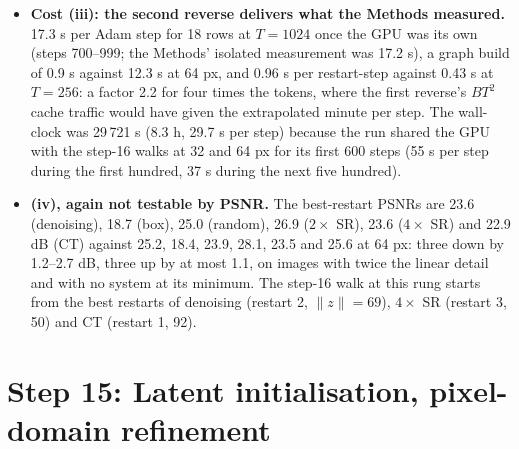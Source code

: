 \documentclass[11pt]{article}
\begin{document}
\begin{itemize}
        whose typical draws have norm 128 produces: the MAP of the 128-px
        posterior is a low-detail point of the prior, and the posterior mean
        the step-16 walk estimates from this start is the fairer object to
        compare across rungs.
  \item \textbf{Cost (iii): the second reverse delivers what the Methods
        measured.} 17.3 s per Adam step for 18 rows at $T = 1024$ once the
        GPU was its own (steps 700--999; the Methods' isolated measurement
        was 17.2 s), a graph build of 0.9 s against 12.3 s at 64 px, and
        0.96 s per restart-step against 0.43 s at $T = 256$: a factor 2.2
        for four times the tokens, where the first reverse's $BT^{2}$ cache
        traffic would have given the extrapolated minute per step. The
        wall-clock was 29\,721 s (8.3 h, 29.7 s per step) because the run
        shared the GPU with the step-16 walks at 32 and 64 px for its first
        600 steps (55 s per step during the first hundred, 37 s during the
        next five hundred).
  \item \textbf{(iv), again not testable by PSNR.} The best-restart PSNRs
        are 23.6 (denoising), 18.7 (box), 25.0 (random), 26.9 ($2\times$
        SR), 23.6 ($4\times$ SR) and 22.9 dB (CT) against 25.2, 18.4, 23.9,
        28.1, 23.5 and 25.6 at 64 px: three down by 1.2--2.7 dB, three up by
        at most 1.1, on images with twice the linear detail and with no
        system at its minimum. The step-16 walk at this rung starts from
        the best restarts of denoising (restart 2, $\|z\| = 69$), $4\times$
        SR (restart 3, 50) and CT (restart 1, 92).
\end{itemize}

\section{Step 15: Latent initialisation, pixel-domain refinement}
\label{sec:step15}
\end{document}
